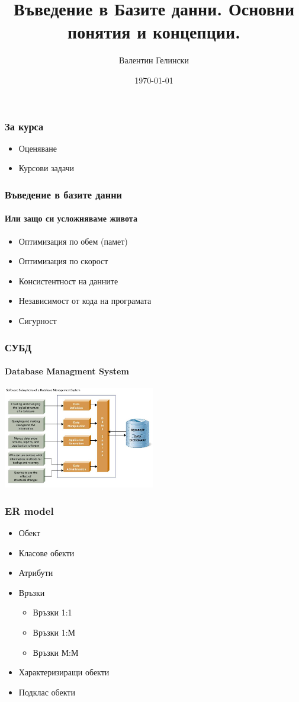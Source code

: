 \documentclass{beamer}
\title{Въведение в Базите данни. Основни понятия и концепции.}
\author{Валентин Гелински}
\institute{ТУ София}
\date{\today}
\begin{document}

  \begin{frame} 
    \titlepage
  \end{frame}

  \begin{frame}
    \frametitle{За курса}
    \begin{itemize}
      \item{Оценяване}
      \item{Курсови задачи}
    \end{itemize}
  \end{frame}

  \begin{frame}
    \frametitle{Въведение в базите данни}
    \framesubtitle{Или защо си усложняваме живота}
    \begin{itemize}
      \item{Оптимизация по обем (памет)}
      \item{Оптимизация по скорост}
      \item{Консистентност на данните}
      \item{Независимост от кода на програмата}
      \item{Сигурност}
    \end{itemize}
  \end{frame}

  \begin{frame}
    \frametitle{СУБД}
    \framesubtitle{Database Managment System}
    \includegraphics[width=250px]{img/rdbms}
  \end{frame}

  \begin{frame}
    \frametitle{ER model}
    \begin{itemize}
      \item{Обект}
      \item{Класове обекти}
      \item{Атрибути}
      \item{Връзки}
      \begin{itemize}
        \item{Връзки 1:1}
        \item{Връзки 1:М}
        \item{Връзки М:М}
      \end{itemize}
      \item{Характеризиращи обекти}
      \item{Подклас обекти}
    \end{itemize}
  \end{frame}
\end{document}
